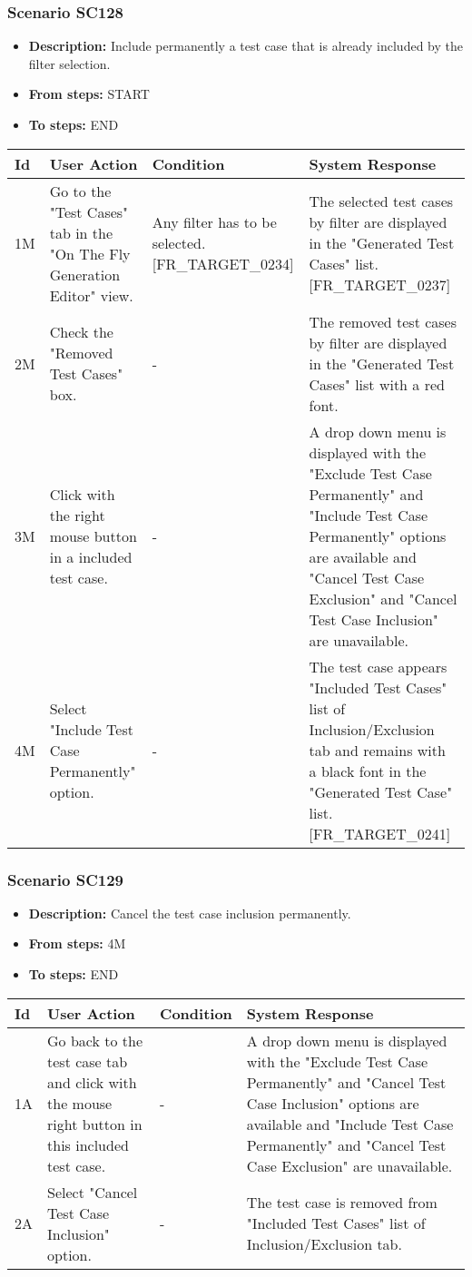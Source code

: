 \documentclass[a4paper,11pt]{article}
\newcommand{\bl}{\\ \hline}
\begin{document}
\subsubsection*{Scenario SC128}
\begin{itemize}
\item {\bf Description:} Include permanently a test case that is already
					included by the filter selection.
\item {\bf From steps:} START
\item {\bf To steps:} END
\end{itemize}
\begin{tabular}{|p{0.4in}|p{1.5in}|p{1.5in}|p{1.5in}|}
\hline
Id & User Action & Condition & System Response \bl 
1M & Go to the "Test Cases" tab in the "On The Fly Generation
						Editor" view. & Any filter has to be selected. [FR_TARGET_0234]
					 & The selected test cases by filter are displayed in the
						"Generated Test Cases" list. [FR_TARGET_0237]\bl
2M & Check the "Removed Test Cases" box. & - & The removed test cases by filter are displayed in the
						"Generated Test Cases" list with a red font.\bl
3M & Click with the right mouse button in a included test case.
					 & - & A drop down menu is displayed with the "Exclude Test Case
						Permanently" and "Include Test Case Permanently" options are
						available and "Cancel Test Case Exclusion" and "Cancel Test Case
						Inclusion" are unavailable. \bl
4M & Select "Include Test Case Permanently" option. & - & The test case appears "Included Test Cases" list of
						Inclusion/Exclusion tab and remains with a black font in the
						"Generated Test Case" list. [FR_TARGET_0241]\bl
\end{tabular}
\subsubsection*{Scenario SC129}
\begin{itemize}
\item {\bf Description:} Cancel the test case inclusion permanently.
				
\item {\bf From steps:} 4M
\item {\bf To steps:} END
\end{itemize}
\begin{tabular}{|p{0.4in}|p{1.5in}|p{1.5in}|p{1.5in}|}
\hline
Id & User Action & Condition & System Response \bl 
1A & Go back to the test case tab and click with the mouse right
						button in this included test case. & - & A drop down menu is displayed with the "Exclude Test Case
						Permanently" and "Cancel Test Case Inclusion" options are
						available and "Include Test Case Permanently" and "Cancel Test
						Case Exclusion" are unavailable.\bl
2A & Select "Cancel Test Case Inclusion" option. & - & The test case is removed from "Included Test Cases" list
						of Inclusion/Exclusion tab.\bl
\end{tabular}
\end{document}
